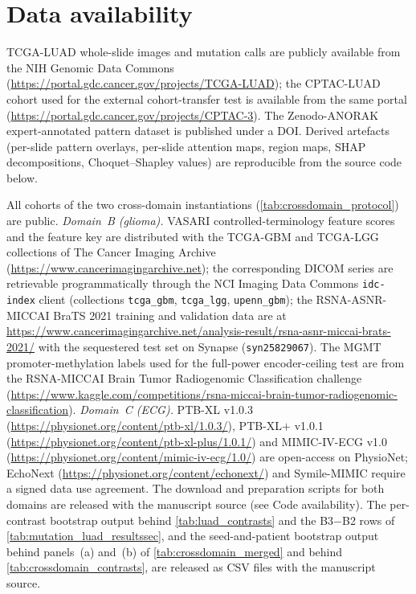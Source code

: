 
\section*{Data availability}
TCGA-LUAD whole-slide images and mutation calls are publicly
available from the NIH Genomic Data Commons
(\url{https://portal.gdc.cancer.gov/projects/TCGA-LUAD}); the
CPTAC-LUAD cohort used for the external cohort-transfer test is
available from the same portal
(\url{https://portal.gdc.cancer.gov/projects/CPTAC-3}).
The Zenodo-ANORAK expert-annotated pattern dataset is published
under a DOI.\cite{ANORAKZenodo}
Derived artefacts (per-slide pattern overlays, per-slide attention
maps, region maps, SHAP decompositions, Choquet--Shapley values)
are reproducible from the source code below.

All cohorts of the two cross-domain instantiations
(\cref{tab:crossdomain_protocol}) are public.
\emph{Domain~B (glioma).}
VASARI controlled-terminology feature scores and the feature key are
distributed with the TCGA-GBM and TCGA-LGG collections of The Cancer
Imaging Archive (\url{https://www.cancerimagingarchive.net});
the corresponding DICOM series are retrievable programmatically
through the NCI Imaging Data Commons \texttt{idc-index} client
(collections \texttt{tcga\_gbm}, \texttt{tcga\_lgg},
\texttt{upenn\_gbm}); the RSNA-ASNR-MICCAI BraTS 2021 training and
validation data are at
\url{https://www.cancerimagingarchive.net/analysis-result/rsna-asnr-miccai-brats-2021/}
with the sequestered test set on Synapse
(\texttt{syn25829067}).\cite{baid2021brats}
The MGMT promoter-methylation labels used for the full-power
encoder-ceiling test are from the RSNA-MICCAI Brain Tumor Radiogenomic
Classification challenge
(\url{https://www.kaggle.com/competitions/rsna-miccai-brain-tumor-radiogenomic-classification}).
\emph{Domain~C (ECG).}
PTB-XL v1.0.3 (\url{https://physionet.org/content/ptb-xl/1.0.3/}),
PTB-XL$+$ v1.0.1
(\url{https://physionet.org/content/ptb-xl-plus/1.0.1/}) and
MIMIC-IV-ECG v1.0
(\url{https://physionet.org/content/mimic-iv-ecg/1.0/}) are
open-access on PhysioNet; EchoNext
(\url{https://physionet.org/content/echonext/}) and Symile-MIMIC
require a signed data use agreement.
The download and preparation scripts for both domains are released
with the manuscript source (see Code availability).
The per-contrast bootstrap output behind \cref{tab:luad_contrasts} and
the B3$-$B2 rows of \cref{tab:mutation_luad_resultssec}, and the
seed-and-patient bootstrap output behind panels~(a) and~(b) of
\cref{tab:crossdomain_merged} and behind \cref{tab:crossdomain_contrasts},
are released as CSV files with the
manuscript source.

